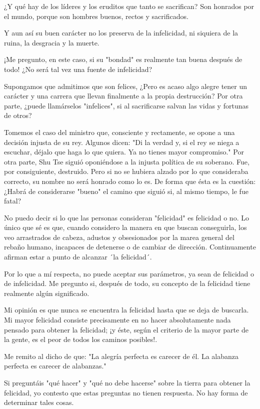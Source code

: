 ¿Y qué hay de los líderes y los eruditos que tanto se sacrifican? Son
honrados por el mundo, porque son hombres buenos, rectos y sacrificados.

Y aun así su buen carácter no los preserva de la infelicidad, ni
siquiera de la ruina, la desgracia y la muerte.

¡Me pregunto, en este caso, si su "bondad" es realmente tan buena
después de todo! ¿No será tal vez una fuente de infelicidad?

Supongamos que admitimos que son felices, ¿Pero es acaso algo alegre
tener un carácter y una carrera que llevan finalmente a la propia
destrucción? Por otra parte, ¿puede llamárselos "infelices", si al
sacrificarse salvan las vidas y fortunas de otros?

Tomemos el caso del ministro que, consciente y rectamente, se opone a
una decisión injusta de su rey. Algunos dicen: "Di la verdad y, si el
rey se niega a escuchar, déjalo que haga lo que quiera. Ya no tienes
mayor compromiso." Por otra parte, Shu Tse siguió oponiéndose a la
injusta política de su soberano. Fue, por consiguiente, destruido. Pero
si no se hubiera alzado por lo que consideraba correcto, su nombre no
será honrado como lo es. De forma que ésta es la cuestión: ¿Habrá de
considerarse "bueno" el camino que siguió si, al mismo tiempo, le fue
fatal?

No puedo decir si lo que las personas consideran "felicidad" es
felicidad o no. Lo único que sé es que, cuando considero la manera en
que buscan conseguirla, los veo arrastrados de cabeza, adustos y
obsesionados por la marea general del rebaño humano, incapaces de
detenerse o de cambiar de dirección. Continuamente afirman estar a punto
de alcanzar ´la felicidad´.

Por lo que a mí respecta, no puede aceptar sus parámetros, ya sean de
felicidad o de infelicidad. Me pregunto si, después de todo, su concepto
de la felicidad tiene realmente algún significado.

Mi opinión es que nunca se encuentra la felicidad hasta que se deja de
buscarla. Mi mayor felicidad consiste precisamente en no hacer
absolutamente nada pensado para obtener la felicidad; ¡y éste, según el
criterio de la mayor parte de la gente, es el peor de todos los caminos
posibles!.

Me remito al dicho de que: "La alegría perfecta es carecer de él. La
alabanza perfecta es carecer de alabanzas."

Si preguntáis "qué hacer" y "qué no debe hacerse" sobre la tierra para
obtener la felicidad, yo contesto que estas preguntas no tienen
respuesta. No hay forma de determinar tales cosas.


